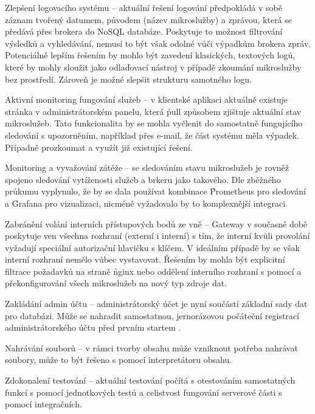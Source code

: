 \begin{dl}
   \item[Zlepšení logovacího systému] – aktuální řešení logování předpokládá v sobě záznam tvořený datumem, původem (název mikroslužby) a zprávou, která se předává přes brokera do NoSQL databáze.
   Poskytuje to možnost filtrování výsledků a vyhledávání, nemusí to být však odolné vůči výpadkům brokera zpráv.
   Potenciálně lepším řešením by mohlo být zavedení klasických, textových logů, které by mohly sloužit jako odlaďovací nástroj v případě zkoumání mikroslužby bez prostředí.
   Zároveň je možné slepšit strukturu samotného logu.
   \item[Aktivní monitoring fungování služeb] – v klientské aplikaci aktuálně existuje stránka v administrátorském panelu, která \h{pull} způsobem zjištuje aktuální stav mikroslužeb.
   Tato funkcionalita by se mohla vyčlenit do samostatně fungujícího sledování s upozorněním, například přes e-mail, že část systému měla výpadek.
   Případně prozkoumat a využít již existující řešení.
   \item[Monitoring a vyvažování zátěže] – se sledováním stavu mikroslužeb je rovněž spojeno sledování vytíženosti služeb a brkeru jako takového.
   Dle zběžného průkumu vyplynulo, že by se dala používat kombinace \h{Prometheus} pro sledování a \h{Grafana} pro vizualizaci, nicméně vyžadovalo by to komplexnější integraci.
   \item[Zabránění volání interních přístupových bodů ze vně] – Gateway v současné době poskytuje ven všechna  rozhraní (externí i interní) s tím, že interní kvůli provolání vyžadují speciální autorizační hlavičku s klíčem.
   V ideálním případě by se však interní rozhraní nemělo vůbec vystavovat.
   Řešením by mohla být explicitní filtrace požadavků na straně \h{nginx} nebo oddělení interního rozhraní s pomocí  a překonfigurování všech mikroslužeb na nový typ zdroje dat.
   \item[Zakládání admin účtu] – administrátorský účet je nyní součástí základní sady dat pro databázi.
   Může se nahradit samostatnou, jernorázovou počáteční registrací administrátorského účtu před prvním startem .
   \item[Nahrávání souborů] – v rámci tvorby obsahu může vzniknout potřeba nahrávat soubory, může to být řešeno s pomocí interpretátoru obsahu.
   \item[Zdokonalení testování] – aktuální testování počítá s otestováním samostatných funkcí s pomocí jednotkových testů a celistvost fungování serverové části s pomocí integračních.

\end{dl}
